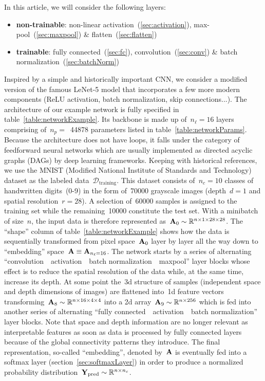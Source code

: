 \documentclass{article}
\begin{document}
\begin{enumerate}
\vspace{1cm}

In this article, we will consider the following layers:
\begin{itemize}
\item {\bf non-trainable}: non-linear activation~(\ref{sec:activation}), max-pool~(\ref{sec:maxpool}) \& flatten~(\ref{sec:flatten})
\item {\bf trainable}: fully connected~(\ref{sec:fc}), convolution~(\ref{sec:conv}) \& batch normalization~(\ref{sec:batchNorm})
\end{itemize}
Inspired by a simple and historically important CNN, we consider a modified version of the famous LeNet-5 model that incorporates a few more modern components (ReLU activation, batch normalization, skip connections...).  The architecture of our example network is fully specified in table~\ref{table:networkExample}.  Its backbone is made up of~$n_\ell = 16$ layers comprising of~$n_p =$~\num[group-separator={,}]{44878} parameters listed in table~\ref{table:networkParams}.  Because the architecture does not have loops, it falls under the category of feedforward neural networks which are usually implemented as directed acyclic graphs (DAGs) by deep learning frameworks.  Keeping with historical references, we use the MNIST (Modified National Institute of Standards and Technology) dataset as the labeled data~$\mathcal{D}_\text{training}$.  This dataset consists of~$n_c=10$ classes of handwritten digits~(0-9) in the form of~\num[group-separator={,}]{70000} grayscale images (depth~$d=1$ and spatial resolution~$r = 28$). A selection of~\num[group-separator={,}]{60000} samples is assigned to the training set while the remaining~\num[group-separator={,}]{10000} constitute the test set.  With a minibatch of size~$n$, the input data is therefore represented as~${\bf A}_0 \sim \mathbb{R}^{n \times 1 \times 28 \times 28}$.  The ``shape'' column of table~\ref{table:networkExample} shows how the data is sequentially transformed from pixel space~${\bf A}_0$ layer by layer all the way down to ``embedding'' space~${\bf A} \equiv {\bf A}_{n_\ell = 16}$.  The network starts by a series of alternating ``convolution~\textemdash~activation~\textemdash~batch normalization~\textemdash~maxpool'' layer blocks whose effect is to reduce the spatial resolution of the data while, at the same time, increase its depth.  At some point the~3d structure of samples (independent space and depth dimensions of images) are flattened into~1d feature vectors transforming~${\bf A}_8 \sim \mathbb{R}^{n\times 16\times 4\times 4}$ into a 2d array~${\bf A}_9 \sim \mathbb{R}^{n\times 256}$ which is fed into another series of alternating ``fully connected~\textemdash~activation~\textemdash~batch normalization'' layer blocks.  Note that space and depth information are no longer relevant as interpretable features as soon as data is processed by fully connected layers because of the global connectivity patterns they introduce.  The final representation, so-called ``embedding'', denoted by~${\bf A}$ is eventually fed into a softmax layer (section~\ref{sec:softmaxLayer}) in order to produce a normalized probability distribution~${\bf Y}_\text{pred} \sim \mathbb{R}^{n\times n_c}$. \\


\end{enumerate}
\end{document}
